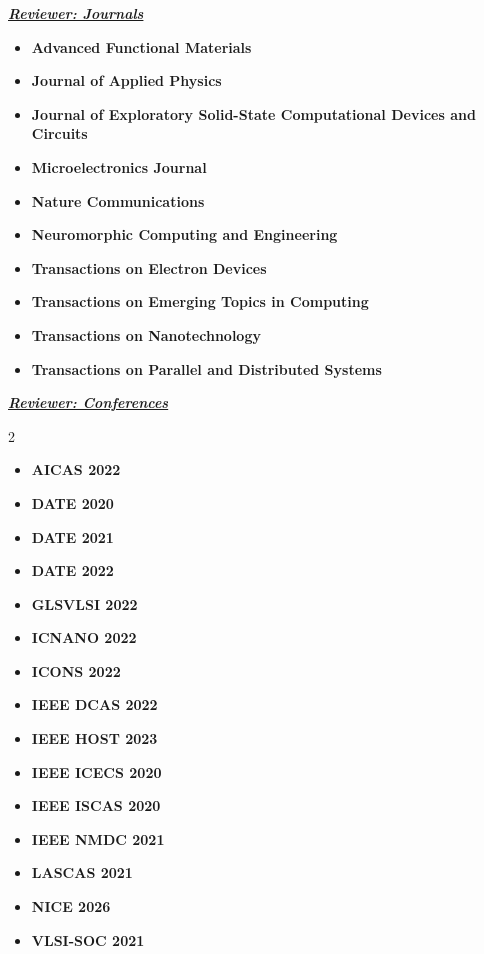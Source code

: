 \documentclass[12pt]{article}
\begin{document}
{\large \textit{\textbf{\ul{Reviewer: Journals}}}}
\begin{itemize}[noitemsep]
\item \textbf{Advanced Functional Materials}
\item \textbf{Journal of Applied Physics}
\item \textbf{Journal of Exploratory Solid-State Computational Devices and Circuits}
\item \textbf{Microelectronics Journal}
\item \textbf{Nature Communications}
\item \textbf{Neuromorphic Computing and Engineering}
\item \textbf{Transactions on Electron Devices}
\item \textbf{Transactions on Emerging Topics in Computing}
\item \textbf{Transactions on Nanotechnology}
\item \textbf{Transactions on Parallel and Distributed Systems}
\end{itemize}

{\large \textit{\textbf{\ul{Reviewer: Conferences}}}}

\begin{multicols}{2}

\begin{itemize}[noitemsep]
\item \textbf{AICAS 2022}
\item \textbf{DATE 2020}
\item \textbf{DATE 2021}
\item \textbf{DATE 2022}
\item \textbf{GLSVLSI 2022}
\item \textbf{ICNANO 2022}
\item \textbf{ICONS 2022}
\item \textbf{IEEE DCAS 2022}
\item \textbf{IEEE HOST 2023}
\item \textbf{IEEE ICECS 2020}
\item \textbf{IEEE ISCAS 2020}
\item \textbf{IEEE NMDC 2021}
\item \textbf{LASCAS 2021}
\item \textbf{NICE 2026}
\item \textbf{VLSI-SOC 2021}
\end{itemize}
\end{multicols}
\end{document}
